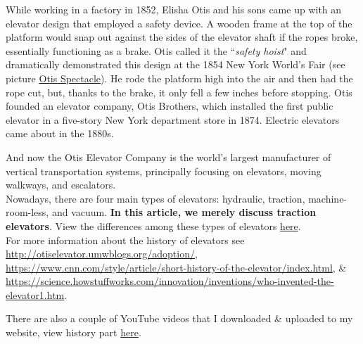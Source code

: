 	While working in a factory in 1852, Elisha Otis and his sons came up with 
	an elevator design that employed a safety device. A wooden frame at the 
	top of the platform would snap out against the sides of the elevator shaft 
	if the ropes broke, essentially functioning as a brake. Otis called it the 
	``\emph{safety hoist}" and dramatically demonstrated this design at the 
	1854 New York World's Fair (see picture
	\hyperref[Otis_spectacle]{Otis Spectacle}).
	He rode the platform high 
	into the air and then had the 
	rope cut, but, thanks to the brake, it only fell a few inches before 
	stopping. Otis founded an elevator company, Otis Brothers, which installed 
	the first public elevator in a five-story New York department store in 
	1874. Electric elevators came about in the 1880s. 
	
	And now the Otis Elevator Company is the world's largest manufacturer of 
	vertical transportation systems, principally focusing on elevators, moving 
	walkways, and escalators.\\[3pt]
	
	Nowadays, there are four main types of elevators: hydraulic, traction, 
	machine-room-less, and vacuum. \textbf{
	In this article, we merely discuss
	traction elevators}. View the differences among these types 
	of elevators \href{
	https://www.vacuumelevators.com/a-guide-for-choosing-the-type-of-elevator-you-need/}
	{here}.\\[3pt]
	
	For more information about the history of elevators see 
	\url{http://otiselevator.umwblogs.org/adoption/}, 
	\url{https://www.cnn.com/style/article/short-history-of-the-elevator/index.html},
	 \&
 	\url{https://science.howstuffworks.com/innovation/inventions/who-invented-the-elevator1.htm}.
 	
 	There are also a couple of YouTube videos that I downloaded \& uploaded to 
 	my website, view history part
 	\href{https://markjohntaylor.com/blog/wordpress/index.php/2020/06/15/the-elevator#history}{here}.
	 	
	\clearpage 